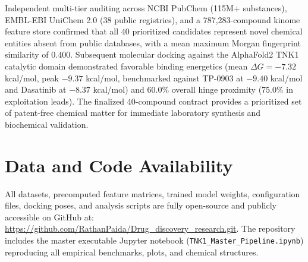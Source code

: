 \documentclass[journal]{IEEEtran}
\begin{document}
Independent multi-tier auditing across NCBI PubChem (115M+ substances), EMBL-EBI UniChem 2.0 (38 public registries), and a 787,283-compound kinome feature store confirmed that all 40 prioritized candidates represent novel chemical entities absent from public databases, with a mean maximum Morgan fingerprint similarity of $0.400$. Subsequent molecular docking against the AlphaFold2 TNK1 catalytic domain demonstrated favorable binding energetics (mean $\Delta G = -7.32$ kcal/mol, peak $-9.37$ kcal/mol, benchmarked against TP-0903 at $-9.40$ kcal/mol and Dasatinib at $-8.37$ kcal/mol) and 60.0\% overall hinge proximity (75.0\% in exploitation leads). The finalized 40-compound contract provides a prioritized set of patent-free chemical matter for immediate laboratory synthesis and biochemical validation.

\section*{Data and Code Availability}
All datasets, precomputed feature matrices, trained model weights, configuration files, docking poses, and analysis scripts are fully open-source and publicly accessible on GitHub at: \url{https://github.com/RathanPaida/Drug_discovery_research.git}. The repository includes the master executable Jupyter notebook (\texttt{TNK1\_Master\_Pipeline.ipynb}) reproducing all empirical benchmarks, plots, and chemical structures.
\end{document}
